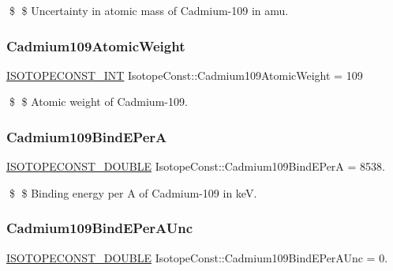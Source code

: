 \$ \$ Uncertainty in atomic mass of Cadmium-\/109 in amu. \mbox{\label{group___isotope_const-_cadmium-_cd109_gaa906cb9d97bae70d9074ebf53c1bbe5a}} 
\subsubsection{\texorpdfstring{Cadmium109\+Atomic\+Weight}{Cadmium109AtomicWeight}}
{\footnotesize\ttfamily \mbox{\hyperlink{group___isotope_const-_macros_ga5f18360b3e99483a35c32d789e62621c}{I\+S\+O\+T\+O\+P\+E\+C\+O\+N\+S\+T\+\_\+\+I\+NT}} Isotope\+Const\+::\+Cadmium109\+Atomic\+Weight = 109}

\$ \$ Atomic weight of Cadmium-\/109. \mbox{\label{group___isotope_const-_cadmium-_cd109_ga19df11d9b99767d694f81a4b285cf981}} 
\subsubsection{\texorpdfstring{Cadmium109\+Bind\+E\+PerA}{Cadmium109BindEPerA}}
{\footnotesize\ttfamily \mbox{\hyperlink{group___isotope_const-_macros_ga8f45a7272ce02c0b4c65c44636ed719a}{I\+S\+O\+T\+O\+P\+E\+C\+O\+N\+S\+T\+\_\+\+D\+O\+U\+B\+LE}} Isotope\+Const\+::\+Cadmium109\+Bind\+E\+PerA = 8538.}

\$ \$ Binding energy per A of Cadmium-\/109 in keV. \mbox{\label{group___isotope_const-_cadmium-_cd109_ga431444f25cb6c25db6187356eddb0842}} 
\subsubsection{\texorpdfstring{Cadmium109\+Bind\+E\+Per\+A\+Unc}{Cadmium109BindEPerAUnc}}
{\footnotesize\ttfamily \mbox{\hyperlink{group___isotope_const-_macros_ga8f45a7272ce02c0b4c65c44636ed719a}{I\+S\+O\+T\+O\+P\+E\+C\+O\+N\+S\+T\+\_\+\+D\+O\+U\+B\+LE}} Isotope\+Const\+::\+Cadmium109\+Bind\+E\+Per\+A\+Unc = 0.}

